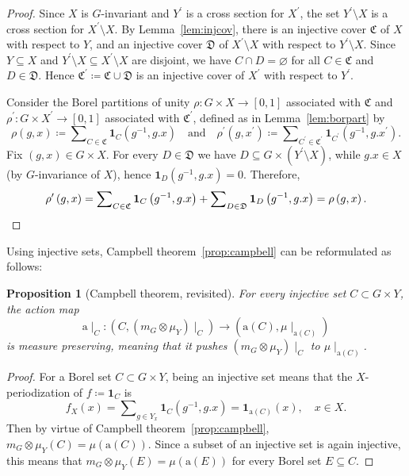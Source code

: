 \documentclass{amsart}
\numberwithin{equation}{subsection}
\newtheorem{prop}[thm]{Proposition}
\theoremstyle{remark}
\begin{document}
\begin{proof}
Since \(X\) is \(G\)-invariant and \(Y^{\prime}\) is a cross section for \(X^{\prime}\), the set \(Y^{\prime}\setminus X\) is a cross section for \(X^{\prime}\setminus X\). By Lemma~\ref{lem:injcov}, there is an injective cover \(\mathfrak{C}\) of \(X\) with respect to \(Y\), and an injective cover \(\mathfrak{D}\) of \(X^{\prime}\setminus X\) with respect to \(Y^{\prime}\setminus X\). Since \(Y\subseteq X\) and \(Y^{\prime}\setminus X\subseteq X^{\prime}\setminus X\) are disjoint, we have \(C\cap D=\varnothing\) for all \(C\in\mathfrak{C}\) and \(D\in\mathfrak{D}\). Hence \(\mathfrak{C}^{\prime}\coloneqq \mathfrak{C}\cup\mathfrak{D}\) is an injective cover of \(X^{\prime}\) with respect to \(Y^{\prime}\).

Consider the Borel partitions of unity \(\rho:G\times X\to\left[0,1\right]\) associated with \(\mathfrak{C}\) and \(\rho^{\prime}:G\times X^{\prime}\to\left[0,1\right]\) associated with \(\mathfrak{C}^{\prime}\), defined as in Lemma~\ref{lem:borpart} by
\[\rho\left(g,x\right)\coloneqq\sum\nolimits_{C\in\mathfrak{C}}\mathbf{1}_{C}\!\left(g^{-1},g.x\right)\quad\text{and}\quad
\rho^{\prime}\left(g,x^{\prime}\right)\coloneqq\sum\nolimits_{C^{\prime}\in\mathfrak{C}^{\prime}}\mathbf{1}_{C^{\prime}}\left(g^{-1},g.x^{\prime}\right).\]
Fix \(\left(g,x\right)\in G\times X\). For every \(D\in\mathfrak{D}\) we have \(D\subseteq G\times\left(Y^{\prime}\setminus X\right)\), while \(g.x\in X\) (by \(G\)-invariance of \(X\)), hence \(\mathbf{1}_{D}\left(g^{-1},g.x\right)=0\). Therefore,
\[\rho^{\prime}\left(g,x\right)
=\sum\nolimits_{C\in\mathfrak{C}}\mathbf{1}_{C}\left(g^{-1},g.x\right)
+\sum\nolimits_{D\in\mathfrak{D}}\mathbf{1}_{D}\left(g^{-1},g.x\right)
=\rho\left(g,x\right). \qedhere\]
\end{proof}

Using injective sets, Campbell theorem~\ref{prop:campbell} can be reformulated as follows:

\begin{prop}[Campbell theorem, revisited]
\label{prop:campbellrevi}
For every injective set \(C\subset G\times Y\), the action map
\[\mathrm{a}\mid_{C}:\left(C,\left(m_{G}\otimes\mu_{Y}\right)\mid_{C}\right)\to\left(\mathrm{a}\left(C\right),\mu\mid_{\mathrm{a}\left(C\right)}\right)\]
is measure preserving, meaning that it pushes \(\left(m_{G}\otimes\mu_{Y}\right)\mid_{C}\) to \(\mu\mid_{\mathrm{a}\left(C\right)}\).
\end{prop}

\begin{proof}
For a Borel set \(C\subset G\times Y\), being an injective set means that the \(X\)-periodization of \(f\coloneqq \mathbf{1}_{C}\) is
\[f_{X}\left(x\right)=\sum\nolimits_{g\in Y_{x}}\mathbf{1}_{C}\left(g^{-1},g.x\right)=\mathbf{1}_{\mathrm{a}\left(C\right)}\left(x\right),\quad x\in X.\]
Then by virtue of Campbell theorem~\ref{prop:campbell}, \(m_{G}\otimes\mu_{Y}\left(C\right)=\mu\left(\mathrm{a}\left(C\right)\right)\). Since a subset of an injective set is again injective, this means that \(m_{G}\otimes\mu_{Y}\left(E\right)=\mu\left(\mathrm{a}\left(E\right)\right)\) for every Borel set \(E\subseteq C\).
\end{proof}
\end{document}
